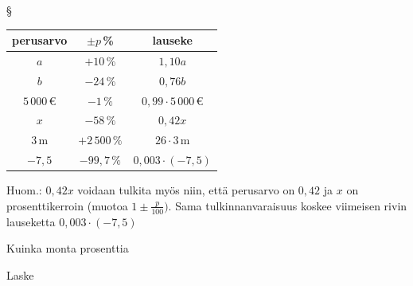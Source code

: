 \begin{tehtavasivu}
\begin{tehtava}
\begin{vastaus}
{§ \begin{scriptsize} \begin{tabular}{|c|c|c|}
\hline 
perusarvo & $\pm p$\,\% & lauseke \\ 
\hline 
$a$ & $+10$\,\% & $1,10a$ \\ 
\hline 
$b$ & $-24$\,\% &$0,76b$ \\ 
\hline 
$5\,000$\,€ & $-1\,\%$ &$0,99\cdot5\,000\,$€ \\ 
\hline 
$x$ &$-58\,\%$ & $0,42x$ \\ 
\hline 
 $3$\,m&$+2\,500\,\%$ &$26\cdot3$\,m \\ 
 \hline
 $-7,5$ & $-99,7\,\%$ & $0,003\cdot(-7,5)$ \\
  \hline %
\end{tabular} \end{scriptsize}

Huom.: $0,42x$ voidaan tulkita myös niin, että perusarvo on $0,42$ ja $x$ on prosenttikerroin (muotoa $1\pm \frac{p}{100})$. Sama tulkinnanvaraisuus koskee viimeisen rivin lauseketta $0,003\cdot (-7,5)$
}
	\end{vastaus}
\end{tehtava}

\begin{tehtava}
    Kuinka monta prosenttia
    \begin{vastaus}
    \end{vastaus}
\end{tehtava}

\begin{tehtava}
    Laske
    \begin{vastaus}
    \end{vastaus}
\end{tehtava}


\end{tehtavasivu}

